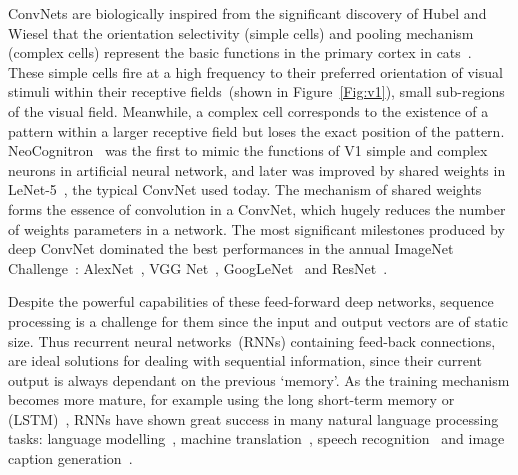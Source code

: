 ConvNets are biologically inspired from the significant discovery of Hubel and Wiesel that the orientation selectivity (simple cells) and pooling mechanism (complex cells) represent the basic functions in the primary cortex in cats~\cite{hubel1962receptive}.
These simple cells fire at a high frequency to their preferred orientation of visual stimuli within their receptive fields~(shown in Figure~\ref{Fig:v1}), small sub-regions of the visual field.
Meanwhile, a complex cell corresponds to the existence of a pattern within a larger receptive field but loses the exact position of the pattern.
NeoCognitron~\cite{fukushima1982neocognitron} was the first to mimic the functions of V1 simple and complex neurons in artificial neural network, and later was improved by shared weights in LeNet-5~\cite{lecun1998gradient}, the typical ConvNet used today.
The mechanism of shared weights forms the essence of convolution in a ConvNet, which hugely reduces the number of weights parameters in a network.
The most significant milestones produced by deep ConvNet dominated the best performances in the annual ImageNet Challenge~\cite{russakovsky2015imagenet}: AlexNet~\cite{krizhevsky2012imagenet}, VGG Net~\cite{simonyan2014very}, GoogLeNet~\cite{szegedy2015going} and ResNet~\cite{he2016deep}.

Despite the powerful capabilities of these feed-forward deep networks, sequence processing is a challenge for them since the input and output vectors are of static size.
Thus recurrent neural networks~(RNNs) containing feed-back connections, are ideal solutions for dealing with sequential information, since their current output is always dependant on the previous `memory'.
As the training mechanism becomes more mature, for example using the long short-term memory or (LSTM)~\cite{hochreiter1997long}, RNNs have shown great success in many natural language processing tasks: language modelling~\cite{mikolov2010recurrent}, machine translation~\cite{sutskever2014sequence}, speech recognition~\cite{graves2014towards} and image caption generation~\cite{karpathy2015deep}.


